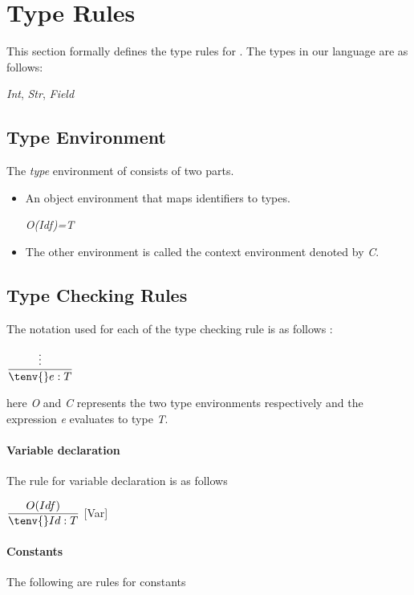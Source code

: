 
\section{Type Rules}
This section formally defines the type rules for \langName{}.
The types in our language are as follows:

\textit{Int}, \textit{Str}, \textit{Field}

\subsection{Type Environment}
The \textit{type} environment of \langName{} consists of two parts.
\begin{itemize}
	\item An object environment that maps identifiers to types.\smallskip

	\hspace*{10em}\textit{O(Idf)=T}
	\item The other environment is called the context environment denoted by \textit{C}.
\end{itemize}

\subsection{Type Checking Rules}
The notation used for each of the type checking rule is as follows :

\hspace*{10em} $ \dfrac{\vdots}{\tenv{} e: T}$

here \textit{O} and \textit{C} represents the two type environments respectively and
the expression \textit{e} evaluates to type \textit{T}.

\paragraph{Variable declaration}
The rule for variable declaration is as follows \bigskip

\hspace*{10em} $ \dfrac{O(Idf)}{\tenv{} Id: T}$ [Var]

\paragraph{Constants} The following are rules for constants \bigskip

